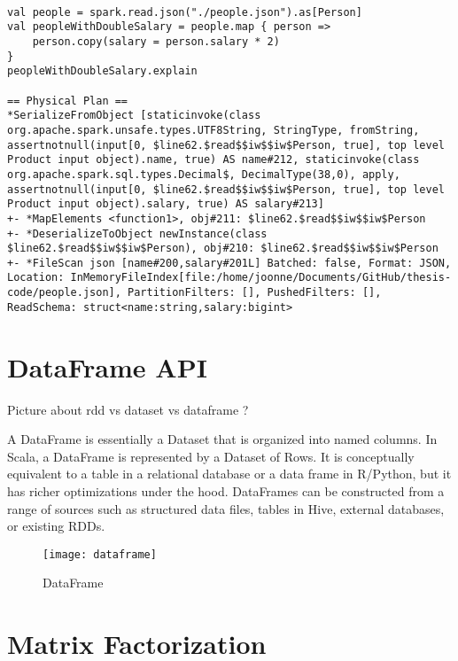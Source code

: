 \documentclass[main.tex]{thesis.tex}
\begin{document}
\begin{lstlisting}[caption=Displaying the logical and physical plan of a Dataset]

val people = spark.read.json("./people.json").as[Person]
val peopleWithDoubleSalary = people.map { person => 
	person.copy(salary = person.salary * 2)
}
peopleWithDoubleSalary.explain

== Physical Plan ==
*SerializeFromObject [staticinvoke(class org.apache.spark.unsafe.types.UTF8String, StringType, fromString, assertnotnull(input[0, $line62.$read$$iw$$iw$Person, true], top level Product input object).name, true) AS name#212, staticinvoke(class org.apache.spark.sql.types.Decimal$, DecimalType(38,0), apply, assertnotnull(input[0, $line62.$read$$iw$$iw$Person, true], top level Product input object).salary, true) AS salary#213]
+- *MapElements <function1>, obj#211: $line62.$read$$iw$$iw$Person
+- *DeserializeToObject newInstance(class $line62.$read$$iw$$iw$Person), obj#210: $line62.$read$$iw$$iw$Person
+- *FileScan json [name#200,salary#201L] Batched: false, Format: JSON, Location: InMemoryFileIndex[file:/home/joonne/Documents/GitHub/thesis-code/people.json], PartitionFilters: [], PushedFilters: [], ReadSchema: struct<name:string,salary:bigint>

\end{lstlisting}

\section{DataFrame API}

Picture about rdd vs dataset vs dataframe ?

A DataFrame is essentially a Dataset that is organized into named columns.
In Scala, a DataFrame is represented by a Dataset of Rows.
It is conceptually equivalent to a table in a relational database or a data frame in R/Python, but it has richer optimizations under the hood.
DataFrames can be constructed from a range of sources such as structured data files, tables in Hive, external databases, or existing RDDs.
\cite{spark-sql-programming-guide}

\begin{figure}[h]
	\caption{DataFrame}
	\centering
	\texttt{[image: dataframe]}
\end{figure}

\section{Matrix Factorization}
\end{document}
